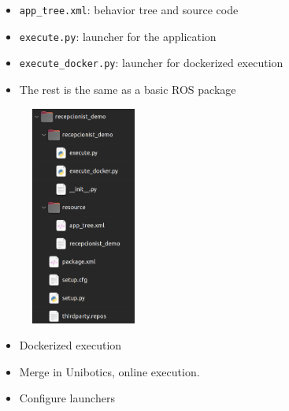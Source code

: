 \documentclass[notes,slidesec,a4]{seminar}
\begin{document}
\begin{hslide}
 \newpage
  \begin{minipage}[t]{7cm}
	\vspace{2cm}
  	\begin{itemize}
	  	\item \texttt{app\_tree.xml}: behavior tree and source code
		\item \texttt{execute.py}: launcher for the application
		\item \texttt{execute\_docker.py}: launcher for dockerized execution
		\item The rest is the same as a basic ROS package
	\end{itemize}
  \end{minipage}
  \begin{minipage}[t]{5cm}
  	\begin{figure}
  		\centerline{\includegraphics[height=7.2cm]{figs/package-struct.png}}
  	\end{figure}
  \end{minipage}
  
  
\end{hslide}

\begin{hslide}
  \begin{itemize}
  \item Dockerized execution
  \item Merge in Unibotics, online execution.
  \item Configure launchers
  \end{itemize}
\end{hslide}
\end{document}
